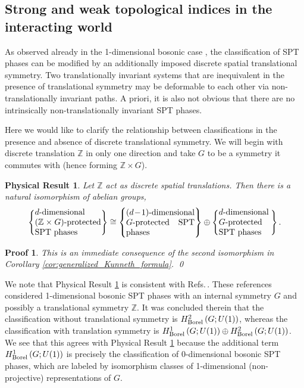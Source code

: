 \documentclass[sort&compress]{elsarticle}
\theoremstyle{theoremstyle}
\theoremstyle{framedtheoremstyle}
\newtheorem{rslt}{Physical Result}
\theoremstyle{definitionstyle}
\theoremstyle{definitionstyle}
\theoremstyle{definitionstyle}
\theoremstyle{definitionstyle}
\theoremstyle{nameddefinitionstyle}
\theoremstyle{framednameddefinitionstyle}
\theoremstyle{proofstyle}
\newtheorem{pf}{Proof}
\theoremstyle{definitionstyle}
\newcommand{\ZZZ}{\mathbb{Z}}
\newcommand{\isomorphic}{\cong}
\newcommand{\paren}[1]{\left( #1 \right)}
\newcommand{\braces}[1]{\left\{ #1 \right\}}
\begin{document}
\subsection{Strong and weak topological indices in the interacting world\label{subsec:strong_weak_topological_indices_interacting_world}}

As observed already in the 1-dimensional bosonic case \cite{Wen_1d, Cirac}, the classification of SPT phases can be modified by an additionally imposed discrete spatial translational symmetry. Two translationally invariant systems that are inequivalent in the presence of translational symmetry may be deformable to each other via non-translationally invariant paths. A priori, it is also not obvious that there are no intrinsically non-translationally invariant SPT phases.

Here we would like to clarify the relationship between classifications in the presence and absence of discrete translational symmetry. We will begin with discrete translation $\ZZZ$ in only one direction and take $G$ to be a symmetry it commutes with (hence forming $\ZZZ\times G$).

\begin{framed}\begin{rslt}\label{rslt:strong_weak_isomorphism}
Let $\ZZZ$ act as discrete spatial translations. Then there is a natural isomorphism of abelian groups,
\begin{eqnarray}
\braces{\parbox{2.8cm}{$d$-dimensional $(\ZZZ \times G)$-protected SPT phases}}
\isomorphic
\braces{\parbox{2.9cm}{$(d-1)$-dimensional $G$-protected SPT phases}}
\oplus
\braces{\parbox{2.2cm}{$d$-dimensional $G$-protected SPT phases}}.\label{strong_weak_topological_indices_interacting_world_isomorphism}
\end{eqnarray}
\end{rslt}\end{framed}

\begin{pf}
This is an immediate consequence of the second isomorphism in Corollary \ref{cor:generalized_Kunneth_formula}.
\qed\end{pf}

We note that Physical Result \ref{rslt:strong_weak_isomorphism} is consistent with Refs.\,\cite{Wen_1d, Cirac, Wen_sgSPT_1d}. These references considered 1-dimensional bosonic SPT phases with an internal symmetry $G$ and possibly a translational symmetry $\ZZZ$. It was concluded therein that the classification without translational symmetry is $H^2_{\rm Borel}\paren{G; U(1)}$, whereas the classification with translation symmetry is $H^1_{\rm Borel}\paren{G;U(1)} \oplus H^2_{\rm Borel}\paren{G; U(1)}$. We see that this agrees with Physical Result \ref{rslt:strong_weak_isomorphism} because the additional term $H^1_{\rm Borel}\paren{G;U(1)}$ is precisely the classification of 0-dimensional bosonic SPT phases, which are labeled by isomorphism classes of 1-dimensional (non-projective) representations of $G$.
\end{document}

